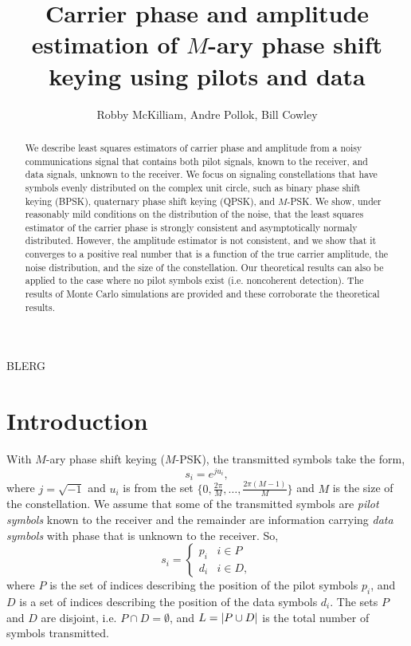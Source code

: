 \documentclass[journal]{IEEEtran}
\title{Carrier phase and amplitude estimation of $M$-ary phase shift keying using pilots and data}
\author{Robby McKilliam, Andre Pollok, Bill Cowley}
\begin{document}
\maketitle

\begin{abstract}
We describe least squares estimators of carrier phase and amplitude from a noisy communications signal that contains both pilot signals, known to the receiver, and data signals, unknown to the receiver.  We focus on signaling constellations that have symbols evenly distributed on the complex unit circle, such as binary phase shift keying (BPSK), quaternary phase shift keying (QPSK), and $M$-PSK.  We show, under reasonably mild conditions on the distribution of the noise, that the least squares estimator of the carrier phase is strongly consistent and asymptotically normaly distributed.  However, the amplitude estimator is not consistent, and we show that it converges to a positive real number that is a function of the true carrier amplitude, the noise distribution, and the size of the constellation.  Our theoretical results can also be applied to the case where no pilot symbols exist (i.e. noncoherent detection).  The results of Monte Carlo simulations are provided and these corroborate the theoretical results.   
\end{abstract}
\begin{IEEEkeywords}
BLERG
\end{IEEEkeywords}

\section{Introduction}

With $M$-ary phase shift keying ($M$-PSK), the transmitted symbols take the form,
\[
s_i = e^{j u_i},
\]
where $j = \sqrt{-1}$ and $u_i$ is from the set $\{0, \tfrac{2\pi}{M}, \dots, \tfrac{2\pi(M-1)}{M}\}$ and $M$ is the size of the constellation.  We assume that some of the transmitted symbols are \emph{pilot symbols} known to the receiver and the remainder are information carrying \emph{data symbols} with phase that is unknown to the receiver.  So,
\[
s_i = \begin{cases}
p_i & i \in P \\
d_i & i \in D,
\end{cases}
\]
where $P$ is the set of indices describing the position of the pilot symbols $p_i$, and $D$ is a set of indices describing the position of the data symbols $d_i$.  The sets $P$ and $D$ are disjoint, i.e. $P \cap D = \emptyset$, and $L = {\left\vert P \cup D \right\vert}$ is the total number of symbols transmitted.
\end{document}
